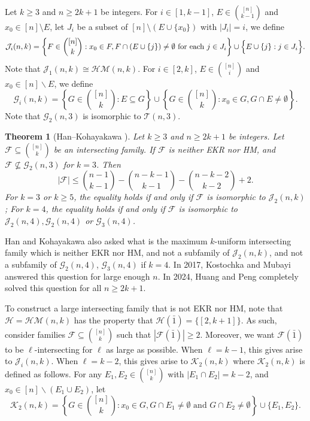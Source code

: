 \documentclass[11pt]{article}
\numberwithin{equation}{section}
\newtheorem{theorem}{Theorem}[section]
\begin{document}
Let $k \geq 3$ and $n \geq 2 k+1$ be integers. 
For $ i \in[1, k-1]$, $E \in \binom{[n]}{k-1}$ and $x_0 \in [n] \setminus E$, let $J_i$ be a subset of $[n]\setminus (E\cup \{x_0\})$ with $|J_i|=i$, we define 
$$
\mathcal{J}_i(n, k)=\left\{F \in\binom{[n]}{k}: x_0 \in F, F \cap (E\cup\{j\}) \neq \emptyset \text{ for each } j \in J_i\right\} \cup \Bigl\{E \cup\{j\}: j \in J_i\Bigr\} .
$$
Note that $\mathcal{J}_1(n,k)\cong\mathcal{HM}(n,k)$.  
For $i \in[2, k]$, $E \in \binom{[n]}{i}$ and $x_0 \in[n]\backslash E$, we define 
$$
\mathcal{G}_i(n, k)=\left\{G \in\binom{[n]}{k}: E \subseteq G\right\} \cup\left\{G \in\binom{[n]}{k}: x_0 \in G, G \cap E \neq \emptyset\right\} .
$$
Note that $\mathcal{G}_2(n, 3)$ is isomorphic to $\mathcal{T}(n, 3)$.








\begin{theorem}[Han--Kohayakawa \cite{H17}] 
\label{H17}
	Let $k \geq 3$ and $ n\geq 2 k+1$ be integers. Let $\mathcal{F} \subseteq\binom{[n]}{k}$ be an intersecting family. If $\mathcal{F}$ is neither EKR nor HM, and $\mathcal{F} \nsubseteq \mathcal{G}_2(n, 3)$ for $k=3$. Then
$$
|\mathcal{F}|\leq\binom{n-1}{k-1}-\binom{n-k-1}{k-1}-\binom{n-k-2}{k-2}+2.
$$
 For $k=3$ or $k\ge 5$, the equality holds if and only if $\mathcal{F}$ is isomorphic to  $\mathcal{J}_2(n, k)$; 
  For $k=4$, the equality holds if and only if $\mathcal{F} $ is isomorphic to $ \mathcal{J}_2(n, 4), \mathcal{G}_2(n, 4)$ or $\mathcal{G}_3(n, 4)$.
\end{theorem}


Han and Kohayakawa \cite{H17} also asked what is the maximum $k$-uniform intersecting family which is neither EKR nor HM, and not a subfamily of $\mathcal{J}_2(n, k)$,  and not a subfamily of $\mathcal{G}_2(n, 4)$, $\mathcal{G}_3(n, 4)$ if $k=4$. In 2017, Kostochka and Mubayi \cite{KM17} answered this question for large enough $n$. In 2024, Huang and Peng \cite{H24} completely solved this question for all $n\geq 2k+1$. 


To construct a large intersecting family that is not EKR nor HM, note that $\mathcal{H}=\mathcal{HM}(n,k)$ has the property that $\mathcal{H}(\bar{1})=\{[2,k+1]\}$. As such, consider families $\mathcal{F}\subseteq\binom{[n]}{k}$ such that $|\mathcal{F}(\bar{1})|\geq 2$. Moreover, we want $\mathcal{F}(\bar{1})$ to be $\ell$-intersecting for $\ell$ as large as possible. When $\ell=k-1$, this gives arise to $\mathcal{J}_{i}(n,k)$. When $\ell=k-2$, this gives arise to $\mathcal{K}_{2}(n,k)$ where  $\mathcal{K}_2(n, k)$ is defined as follows.
For any $E_1, E_2 \in \binom{[n]}{k}$ with $|E_1\cap E_2|=k-2$, and $x_0\in [n]\backslash (E_1\cup E_2)$, let
$$
\mathcal{K}_2(n, k)=\left\{G \in\binom{[n]}{k}: x_0\in G,  G \cap E_1 \neq \emptyset \text{ and } G \cap E_2 \neq \emptyset\right\}\cup\{E_1, E_2\}.
$$
\end{document}
